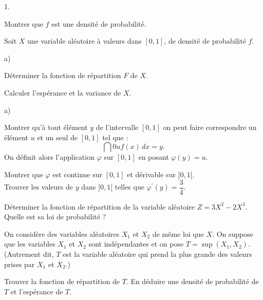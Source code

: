 \documentclass[11pt]{article}%
\begin{document}
\begin{noliste}{1.}
 \setlength{\itemsep}{4mm}
\item Montrer que $f$ est une densité de probabilité.

\item Soit $X$ une variable aléatoire à valeurs dans $[0,1]$, de
densité de
probabilité $f$.

\begin{noliste}{a)}
 \setlength{\itemsep}{2mm}
\item Déterminer la fonction de répartition $F$ de $X$.

\item Calculer l'espérance et la variance de $X$.
\end{noliste}

\item 

\begin{noliste}{a)}
 \setlength{\itemsep}{2mm}
\item Montrer qu'à tout élément $y$ de l'intervalle $[0,1]$ on peut
faire
correspondre un élément $u$ et un seul de $[0,1]$ tel que : 
\[
\dint{0}{u}f(x)\,dx = y.
\]
On définit alors l'application $\varphi $ sur $[0,1]$ en posant
$\varphi
(y) = u$.

\item Montrer que $\varphi $ est continue sur $[0,1]$ et dérivable sur
$]0,1[ $. \\
Trouver les valeurs de $y$ dans $]0,1[$ telles que $\varphi ^{\prime
}(y) = \dfrac{3}{4}$.

\item Déterminer la fonction de répartition de la variable aléatoire $Z
= 3X^{2}-2X^{3}$. \\
Quelle est sa loi de probabilité ?
\end{noliste}

\item On considère des variables aléatoires $X_{1}$ et $X_{2}$ de même
loi
que $X$. On suppose que les variables $X_{1}$ et $X_{2}$ sont
indépendantes
et on pose $T = \sup (X_{1},X_{2})$. (Autrement dit, $T$ est la
variable aléatoire qui prend la plus grande des valeurs prises par
$X_{1}$ et $X_{2}$.)

Trouver la fonction de répartition de $T$. En déduire une densité de
probabilité de $T$ et l'espérance de $T$.
\end{noliste}

\label{fin}
\end{document}
